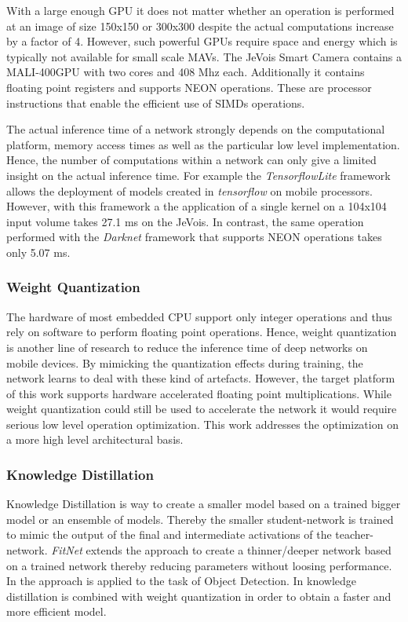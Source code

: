 With a large enough \ac{GPU} it does not matter whether an operation is performed at an image of size 150x150 or 300x300 despite the actual computations increase by a factor of 4. However, such powerful \acp{GPU} require space and energy which is typically not available for small scale \acp{MAV}. The JeVois Smart Camera contains a MALI-400GPU with two cores and 408 Mhz each. Additionally it contains floating point registers and supports NEON operations. These are processor instructions that enable the efficient use of \acp{SIMD} operations.

The actual inference time of a network strongly depends on the computational platform, memory access times as well as the particular low level implementation. Hence, the number of computations within a network can only give a limited insight on the actual inference time. For example the \textit{TensorflowLite} framework allows the deployment of models created in \textit{tensorflow} on mobile processors. However, with this framework a the application of a single kernel on a 104x104 input volume takes 27.1 ms on the JeVois. In contrast, the same operation performed with the \textit{Darknet} framework that supports NEON operations takes only 5.07 ms. 


\subsubsection{Weight Quantization}

The hardware of most embedded \ac{CPU} support only integer operations and thus rely on software to perform floating point operations. Hence, weight quantization is another line of research to reduce the inference time of deep networks on mobile devices. By mimicking the quantization effects during training, the network learns to deal with these kind of artefacts. However, the target platform of this work supports hardware accelerated floating point multiplications. While weight quantization could still be used to accelerate the network it would require serious low level operation optimization. This work addresses the optimization on a more high level architectural basis.

\subsubsection{Knowledge Distillation}

Knowledge Distillation \cite{Hinton2006} is way to create a smaller model based on a trained bigger model or an ensemble of models. Thereby the smaller student-network is trained to mimic the output of the final and intermediate activations of the teacher-network. \textit{FitNet} extends the approach to create a thinner/deeper network based on a trained network thereby reducing parameters without loosing performance. In \cite{Li2017c} the approach is applied to the task of Object Detection. In \cite{Wei2018a} knowledge distillation is combined with weight quantization in order to obtain a faster and more efficient model.


